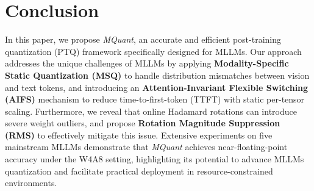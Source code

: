 \vspace{-3mm}
\section{Conclusion} \label{sec:conclusion}
\vspace{-2mm}
In this paper, we propose \emph{MQuant}, an accurate and efficient post-training quantization (PTQ) framework specifically designed for MLLMs. Our approach addresses the unique challenges of MLLMs by applying \textbf{Modality-Specific Static Quantization (MSQ)} to handle distribution mismatches between vision and text tokens, and introducing an \textbf{Attention-Invariant Flexible Switching (AIFS)} mechanism to reduce time-to-first-token (TTFT) with static per-tensor scaling. Furthermore, we reveal that online Hadamard rotations can introduce severe weight outliers, and propose \textbf{Rotation Magnitude Suppression (RMS)} to effectively mitigate this issue. Extensive experiments on five mainstream MLLMs demonstrate that \emph{MQuant} achieves near-floating-point accuracy under the W4A8 setting, highlighting its potential to advance MLLMs quantization and facilitate practical deployment in resource-constrained environments.